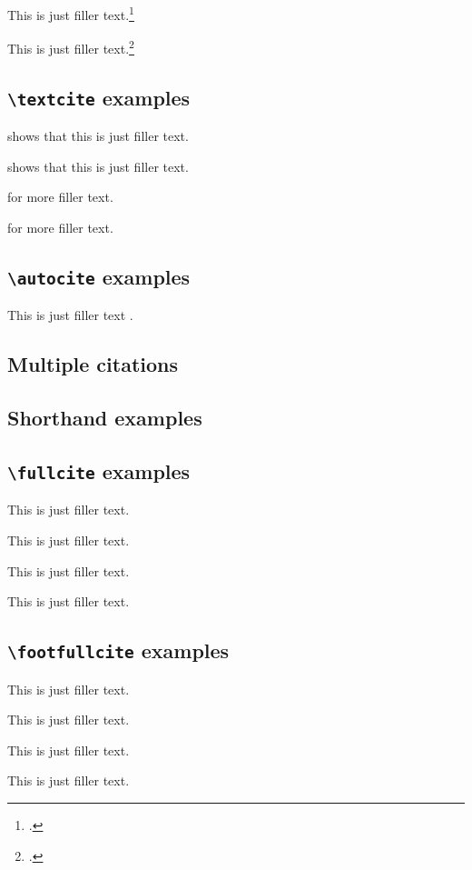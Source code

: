 \documentclass[a4paper]{article}
\newcommand{\cmd}[1]{\texttt{\textbackslash #1}}
\begin{document}
This is just filler text.\footcite[See][]{springer}

This is just filler text.\footcite[See][59--63]{springer}

\subsection*{\cmd{textcite} examples}

\textcite{aristotle:rhetoric} shows that this is just filler text.

\textcite[59]{aristotle:rhetoric} shows that this is just filler text.

\textcite[See][]{springer} for more filler text.

\textcite[See][59--63]{springer} for more filler text.

\subsection*{\cmd{autocite} examples}

This is just filler text \autocite{springer}.

\subsection*{Multiple citations}

\cite{aristotle:rhetoric,aristotle:physics,aristotle:poetics}

\subsection*{Shorthand examples}

\cite{kant:kpv}

\cite[again]{kant:kpv}

\cite{kant:ku}

\subsection*{\cmd{fullcite} examples}

This is just filler text. 

This is just filler text. 

This is just filler text. 

This is just filler text. 

\subsection*{\cmd{footfullcite} examples}

This is just filler text. 

This is just filler text. 

This is just filler text. 

This is just filler text. 

\clearpage

\printshorthands

\nocite{*}
\printbibliography[notkeyword=journalnumberdate]
\end{document}
